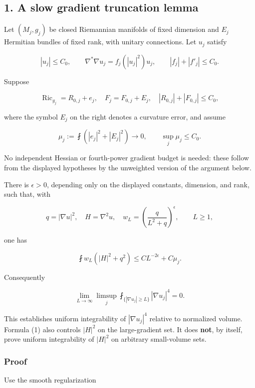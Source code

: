 \documentclass[11pt]{article}
\begin{document}
\hypertarget{a-slow-gradient-truncation-lemma}{%
\subsection{1. A slow gradient truncation
lemma}\label{a-slow-gradient-truncation-lemma}}

Let \((M_j,g_j)\) be closed Riemannian manifolds of fixed dimension and
\(E_j\) Hermitian bundles of fixed rank, with unitary connections. Let
\(u_j\) satisfy

\[
 |u_j|\le C_0,\qquad \nabla^*\nabla u_j=f_j(|u_j|^2)u_j,
 \qquad |f_j|+|f'_j|\le C_0.
\]

Suppose

\[
 \operatorname{Ric}_{g_j}=R_{0,j}+e_j,
 \quad F_j=F_{0,j}+E_j,
 \quad |R_{0,j}|+|F_{0,j}|\le C_0,
\]

where the symbol \(E_j\) on the right denotes a curvature error, and
assume

\[
 \mu_j:=\fint(|e_j|^2+|E_j|^2)\longrightarrow0,
 \qquad \sup_j\mu_j\le C_0.
\]

No independent Hessian or fourth-power gradient budget is needed: these
follow from the displayed hypotheses by the unweighted version of the
argument below.

There is \(\epsilon>0\), depending only on the displayed constants,
dimension, and rank, such that, with

\[
 q=|\nabla u|^2,\quad H=\nabla^2u,\quad
 w_L=\left(\frac q{L^2+q}\right)^\epsilon,
 \qquad L\ge1,
\]

one has

\[
 \boxed{\fint w_L(|H|^2+q^2)
              \le C L^{-2\epsilon}+C\mu_j.}\tag{1}
\]

Consequently

\[
 \boxed{\lim_{L\to\infty}\limsup_j
       \fint_{\{|\nabla u_j|\ge L\}}|\nabla u_j|^4=0.}\tag{2}
\]

This establishes uniform integrability of \(|\nabla u_j|^4\) relative to
normalized volume. Formula (1) also controls \(|H|^2\) on the
large-gradient set. It does \textbf{not}, by itself, prove uniform
integrability of \(|H|^2\) on arbitrary small-volume sets.

\hypertarget{proof}{%
\subsubsection{Proof}\label{proof}}

Use the smooth regularization
\end{document}
